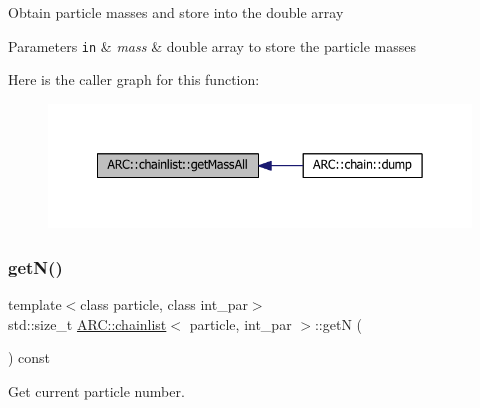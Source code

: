 Obtain particle masses and store into the double array 
\begin{DoxyParams}[1]{Parameters}
\mbox{\tt in}  & {\em mass} & double array to store the particle masses \\
\hline
\end{DoxyParams}
Here is the caller graph for this function\+:
\nopagebreak
\begin{figure}[H]
\begin{center}
\leavevmode
\includegraphics[width=342pt]{classARC_1_1chainlist_a5da7d970dfac2bb11f59d07c1d808f8e_icgraph}
\end{center}
\end{figure}
\hypertarget{classARC_1_1chainlist_a2ed7858b13620c086e2e52b5b8d8020c}{}\label{classARC_1_1chainlist_a2ed7858b13620c086e2e52b5b8d8020c} 
\subsubsection{\texorpdfstring{get\+N()}{getN()}}
{\footnotesize\ttfamily template$<$class particle, class int\+\_\+par$>$ \\
std\+::size\+\_\+t \hyperlink{classARC_1_1chainlist}{A\+R\+C\+::chainlist}$<$ particle, int\+\_\+par $>$\+::getN (\begin{DoxyParamCaption}{ }\end{DoxyParamCaption}) const\hspace{0.3cm}{\ttfamily [inline]}}



Get current particle number. 

